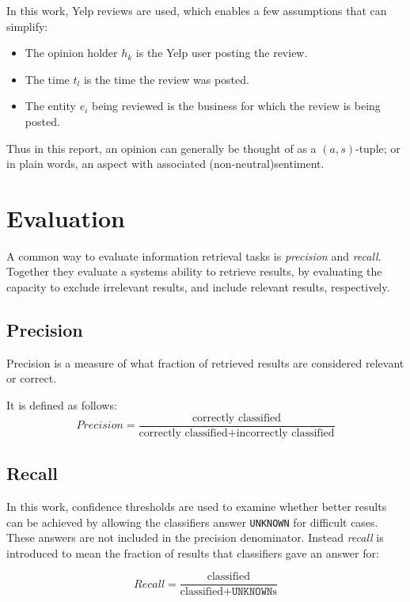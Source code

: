 \documentclass[a4paper,11pt]{kth-mag}
\begin{document}
In this work, Yelp reviews are used, which enables a few assumptions that can simplify:
\begin{itemize}
\item The opinion holder $h_k$ is the Yelp user posting the review.
\item The time $t_l$ is the time the review was posted.
\item The entity $e_i$ being reviewed is the business for which the review is being posted.
\end{itemize}

Thus in this report, an opinion can generally be thought of as a $(a,s)$-tuple; or in plain words, an aspect with associated (non-neutral)sentiment.

\newpage
\section{Evaluation}
A common way to evaluate information retrieval tasks is \emph{precision} and \emph{recall}. Together they evaluate a systems ability to retrieve results, by evaluating the capacity to exclude irrelevant results, and include relevant results, respectively.

\subsection{Precision}
Precision is a measure of what fraction of retrieved results are considered relevant or correct.

It is defined as follows:
\begin{equation} \label{eq:precision}
Precision = \frac{\text {correctly classified}}{\text{correctly classified} + \text{incorrectly classified}}
\end{equation}

\subsection{Recall}
In this work, confidence thresholds are used to examine whether better results can be achieved by allowing the classifiers answer \texttt{UNKNOWN} for difficult cases. These answers are not included in the precision denominator. Instead \emph{recall} is introduced to mean the fraction of results that classifiers gave an answer for:

\begin{equation} \label{eq:recall}
Recall = \frac{\text {classified}}{\text{classified} + \texttt{UNKNOWN}\text{s}}
\end{equation}
\end{document}
